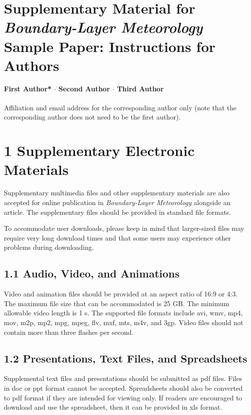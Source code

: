      
 

\newpage

\section*{Supplementary Material for \textit{Boundary-Layer Meteorology} Sample Paper: Instructions for Authors}

{\textbf{First Author* $\cdot$ Second Author $\cdot$ Third Author \\}}
\\
\text{*}Affiliation and email address for the corresponding author only (note that the corresponding author does not need to be the first author).

\section*{1 Supplementary Electronic Materials}
Supplementary multimedia files and other supplementary materials are also accepted for online publication in \textit{Boundary-Layer Meteorology }alongside an article. The supplementary files should be provided in standard file formats.

To accommodate user downloads, please keep in mind that larger-sized files may require very long download times and that some users may experience other problems during downloading.

\subsection*{1.1 Audio, Video, and Animations}
Video and animation files should be provided at an aspect ratio of 16:9 or 4:3. The maximum file size that can be accommodated is 25 GB. The minimum allowable video length is 1 s. The supported file formats include avi, wmv, mp4, mov, m2p, mp2, mpg, mpeg, flv, mxf, mts, m4v, and 3gp. Video files should not contain more than three flashes per second.

\subsection*{1.2 Presentations, Text Files, and Spreadsheets}
Supplemental text files and presentations should be submitted as pdf files. Files in doc or ppt format cannot be accepted. Spreadsheets should also be converted to pdf format if they are intended for viewing only. If readers are encouraged to download and use the spreadsheet, then it can be provided in xls format.

